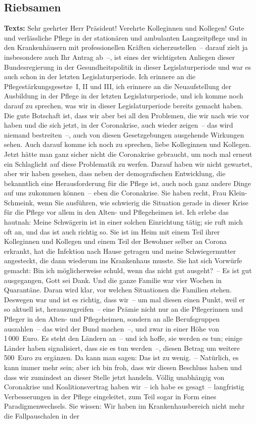 \documentclass{article}
\begin{document}
\subsection{Riebsamen}
\noindent\textbf{Texts:} Sehr geehrter Herr Präsident! Verehrte Kolleginnen und Kollegen! Gute und verlässliche Pflege in der stationären und ambulanten Langzeitpflege und in den Krankenhäusern mit professionellen Kräften sicherzustellen – darauf zielt ja insbesondere auch Ihr Antrag ab –, ist eines der wichtigsten Anliegen dieser Bundesregierung in der Gesundheitspolitik in dieser Legislaturperiode und war es auch schon in der letzten Legislaturperiode. Ich erinnere an die Pflegestärkungsgesetze I, II und III, ich erinnere an die Neuaufstellung der Ausbildung in der Pflege in der letzten Legislaturperiode, und ich komme noch darauf zu sprechen, was wir in dieser Legislaturperiode bereits gemacht haben. Die gute Botschaft ist, dass wir aber bei all den Problemen, die wir nach wie vor haben und die sich jetzt, in der Coronakrise, auch wieder zeigen – das wird niemand bestreiten –, auch von diesen Gesetzgebungen ausgehende Wirkungen sehen. Auch darauf komme ich noch zu sprechen, liebe Kolleginnen und Kollegen. Jetzt hätte man ganz sicher nicht die Coronakrise gebraucht, um noch mal erneut ein Schlaglicht auf diese Problematik zu werfen. Darauf haben wir nicht gewartet, aber wir haben gesehen, dass neben der demografischen Entwicklung, die bekanntlich eine Herausforderung für die Pflege ist, auch noch ganz andere Dinge auf uns zukommen können – eben die Coronakrise. Sie haben recht, Frau Klein-Schmeink, wenn Sie ausführen, wie schwierig die Situation gerade in dieser Krise für die Pflege vor allem in den Alten- und Pflegeheimen ist. Ich erlebe das hautnah: Meine Schwägerin ist in einer solchen Einrichtung tätig; sie ruft mich oft an, und das ist auch richtig so. Sie ist im Heim mit einem Teil ihrer Kolleginnen und Kollegen und einem Teil der Bewohner selber an Corona erkrankt, hat die Infektion nach Hause getragen und meine Schwiegermutter angesteckt, die dann wiederum ins Krankenhaus musste. Sie hat sich Vorwürfe gemacht: Bin ich möglicherweise schuld, wenn das nicht gut ausgeht? – Es ist gut ausgegangen, Gott sei Dank. Und die ganze Familie war vier Wochen in Quarantäne. Daran wird klar, vor welchen Situationen die Familien stehen. Deswegen war und ist es richtig, dass wir – um mal diesen einen Punkt, weil er so aktuell ist, herauszugreifen – eine Prämie nicht nur an die Pflegerinnen und Pfleger in den Alten- und Pflegeheimen, sondern an alle Berufsgruppen auszahlen – das wird der Bund machen –, und zwar in einer Höhe von 1 000 Euro. Es steht den Ländern an – und ich hoffe, sie werden es tun; einige Länder haben signalisiert, dass sie es tun werden –, diesen Betrag um weitere 500 Euro zu ergänzen. Da kann man sagen: Das ist zu wenig. – Natürlich, es kann immer mehr sein; aber ich bin froh, dass wir diesen Beschluss haben und dass wir zumindest an dieser Stelle jetzt handeln.  Völlig unabhängig von Coronakrise und Koalitionsvertrag haben wir – ich habe es gesagt – langfristig Verbesserungen in der Pflege eingeleitet, zum Teil sogar in Form eines Paradigmenwechsels. Sie wissen: Wir haben im Krankenhausbereich nicht mehr die Fallpauschalen in der 
\end{document}
